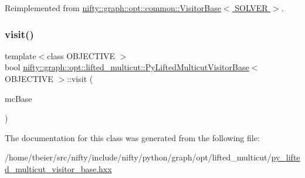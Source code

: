 Reimplemented from \hyperlink{classnifty_1_1graph_1_1opt_1_1common_1_1VisitorBase_a41efc013731cca97176a61be58db0094}{nifty\+::graph\+::opt\+::common\+::\+Visitor\+Base$<$ S\+O\+L\+V\+E\+R $>$}.

\mbox{\label{classnifty_1_1graph_1_1opt_1_1lifted__multicut_1_1PyLiftedMulticutVisitorBase_ab9e6900065799496ae1bd88afee881a4}} 
\subsubsection{\texorpdfstring{visit()}{visit()}}
{\footnotesize\ttfamily template$<$class O\+B\+J\+E\+C\+T\+I\+VE $>$ \\
bool \hyperlink{classnifty_1_1graph_1_1opt_1_1lifted__multicut_1_1PyLiftedMulticutVisitorBase}{nifty\+::graph\+::opt\+::lifted\+\_\+multicut\+::\+Py\+Lifted\+Multicut\+Visitor\+Base}$<$ O\+B\+J\+E\+C\+T\+I\+VE $>$\+::visit (\begin{DoxyParamCaption}\item[{\hyperlink{classnifty_1_1graph_1_1opt_1_1lifted__multicut_1_1PyLiftedMulticutVisitorBase_ab42d6b0fdecfe2dc9232654ce690c923}{Lmc\+Base} $\ast$}]{mc\+Base }\end{DoxyParamCaption})\hspace{0.3cm}{\ttfamily [inline]}}



The documentation for this class was generated from the following file\+:\begin{DoxyCompactItemize}
\item 
/home/tbeier/src/nifty/include/nifty/python/graph/opt/lifted\+\_\+multicut/\hyperlink{py__lifted__multicut__visitor__base_8hxx}{py\+\_\+lifted\+\_\+multicut\+\_\+visitor\+\_\+base.\+hxx}\end{DoxyCompactItemize}

